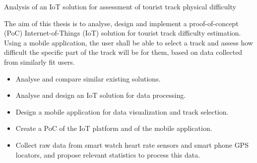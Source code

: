 \linebreak
Analysis of an IoT solution for assessment of tourist track physical difficulty

The aim of this thesis is to analyse, design and implement a proof-of-concept  (PoC) Internet-of-Things (IoT) solution for tourist track difficulty estimation.
Using a mobile application, the user shall be able to select a track and assess how difficult the specific part of the track will be for them, based on data collected from similarly fit users.
\begin{itemize}
    \item Analyse and compare similar existing solutions.
    \item Analyse and design an IoT solution for data processing.
    \item Design a mobile application for data visualization and track selection.
    \item Create a PoC of the IoT platform and of the mobile application.
    \item Collect raw data from smart watch heart rate sensors and smart phone GPS locators, and propose relevant statistics to process this data.
\end{itemize}

